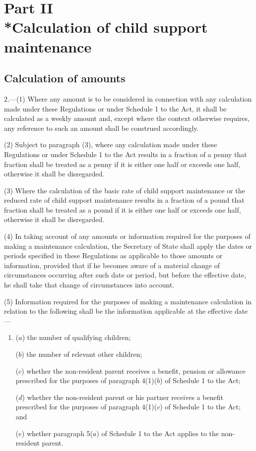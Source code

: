 \documentclass[12pt,a4paper]{article}
\begin{document}

\section[Part II --- Calculation of child support maintenance]{Part II\\*Calculation of child support maintenance}

\renewcommand\parthead{--- Part II}

\subsection[2. Calculation of amounts]{Calculation of amounts}

2.---(1)  Where any amount is to be considered in connection with any calculation made under these Regulations or under Schedule 1 to the Act, it shall be calculated as a weekly amount and, except where the context otherwise requires, any reference to such an amount shall be construed accordingly.

(2) Subject to paragraph (3), where any calculation made under these Regulations or under Schedule 1 to the Act results in a fraction of a penny that fraction shall be treated as a penny if it is either one half or exceeds one half, otherwise it shall be disregarded.

(3) Where the calculation of the basic rate of child support maintenance or the reduced rate of child support maintenance results in a fraction of a pound that fraction shall be treated as a pound if it is either one half or exceeds one half, otherwise it shall be disregarded.

(4) In taking account of any amounts or information required for the purposes of making a maintenance calculation, the Secretary of State shall apply the dates or periods specified in these Regulations as applicable to those amounts or information, provided that if he becomes aware of a material change of circumstances occurring after such date or period, but before the effective date, he shall take that change of circumstances into account.

(5) Information required for the purposes of making a maintenance calculation in relation to the following shall be the information applicable at the effective date—
\begin{enumerate}\item[]
($a$) the number of qualifying children;

($b$) the number of relevant other children;

($c$) whether the non-resident parent receives a benefit, pension or allowance prescribed for the purposes of paragraph 4(1)($b$)  of Schedule 1 to the Act;

($d$) whether the non-resident parent or his partner receives a benefit prescribed for the purposes of paragraph 4(1)($c$)  of Schedule 1 to the Act; and

($e$) whether paragraph 5($a$)  of Schedule 1 to the Act applies to the non-resident parent.
\end{enumerate}
\end{document}
